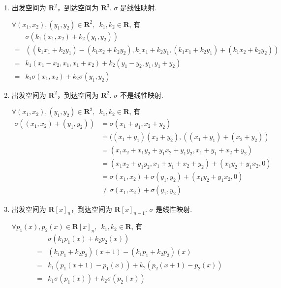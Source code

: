 \begin{solution}
    \begin{enumerate}
        \item 出发空间为 $ \mathbf{R}^2 $，到达空间为 $ \mathbf{R}^3 $. $ \sigma $ 是线性映射.

              $ \forall (x_1, x_2), (y_1, y_2) \in \mathbf{R}^2,\enspace k_1, k_2 \in \mathbf{R} $, 有
              \begin{align*}
                      & \sigma(k_1(x_1, x_2) + k_2(y_1, y_2))                                                                     \\
                  ={} & ((k_1 x_1 + k_2 y_1) - (k_1 x_2 + k_2 y_2), k_1 x_1 + k_2 y_1, (k_1 x_1 + k_2 y_1) + (k_1 x_2 + k_2 y_2)) \\
                  ={} & k_1(x_1 - x_2, x_1, x_1 + x_2) + k_2(y_1 - y_2, y_1, y_1 + y_2)                                           \\
                  ={} & k_1 \sigma(x_1, x_2) + k_2 \sigma(y_1, y_2)
              \end{align*}

        \item 出发空间为 $ \mathbf{R}^2 $，到达空间为 $ \mathbf{R}^2 $. $ \sigma $ 不是线性映射.

              $ \forall (x_1, x_2), (y_1, y_2) \in \mathbf{R}^2,\enspace k_1, k_2 \in \mathbf{R} $, 有
              \begin{align*}
                  \sigma((x_1, x_2) + (y_1, y_2))
                   & = \sigma(x_1 + y_1, x_2 + y_2)                                        \\
                   & = ((x_1 + y_1)(x_2 + y_2), ((x_1 + y_1) + (x_2 + y_2))                \\
                   & = (x_1 x_2 + x_1 y_2 + y_1 x_2 + y_1 y_2, x_1 + y_1 + x_2 + y_2)      \\
                   & = (x_1 x_2 + y_1 y_2, x_1 + y_1 + x_2 + y_2) + (x_1 y_2 + y_1 x_2, 0) \\
                   & = \sigma(x_1, x_2) + \sigma(y_1, y_2) + (x_1 y_2 + y_1 x_2, 0)        \\
                   & \neq \sigma(x_1, x_2) + \sigma(y_1, y_2)
              \end{align*}

        \item 出发空间为 $ \mathbf{R}[x]_n $，到达空间为 $ \mathbf{R}[x]_{n - 1} $. $ \sigma $ 是线性映射.

              $ \forall p_1(x), p_2(x) \in \mathbf{R}[x]_n,\enspace k_1, k_2 \in \mathbf{R} $, 有
              \begin{align*}
                      & \sigma(k_1 p_1(x) + k_2 p_2(x))                     \\
                  ={} & (k_1 p_1 + k_2 p_2)(x + 1) - (k_1 p_1 + k_2 p_2)(x) \\
                  ={} & k_1(p_1(x + 1) - p_1(x)) + k_2(p_2(x + 1) - p_2(x)) \\
                  ={} & k_1 \sigma(p_1(x)) + k_2 \sigma(p_2(x))
              \end{align*}


\end{enumerate}
\end{solution}
